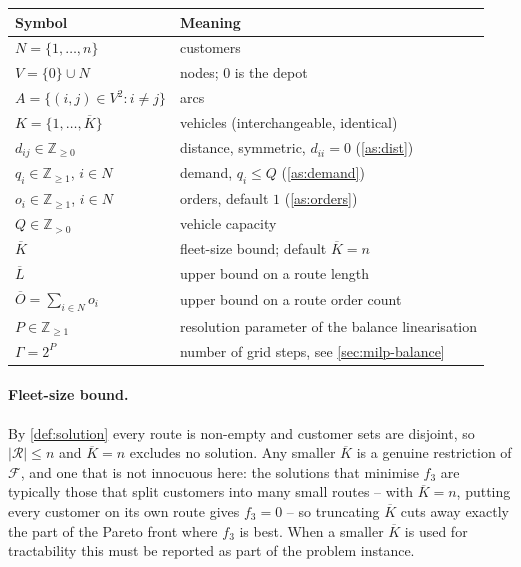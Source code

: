\documentclass[11pt,a4paper]{article}
\theoremstyle{definition}
\theoremstyle{plain}
\newcommand{\Z}{\mathbb{Z}}
\newcommand{\Feas}{\mathcal{F}}
\newcommand{\Routes}{\mathcal{R}}
\newcommand{\Arcs}{A}
\newcommand{\Cust}{N}
\newcommand{\Nodes}{V}
\newcommand{\Veh}{K}
\newcommand{\Lub}{\overline{L}}
\newcommand{\Oub}{\overline{O}}
\begin{document}
\begin{center}
\begin{tabular}{@{}ll@{}}
\toprule
Symbol & Meaning \\
\midrule
$\Cust = \{1,\dots,n\}$ & customers \\
$\Nodes = \{0\} \cup \Cust$ & nodes; $0$ is the depot \\
$\Arcs = \{(i,j) \in \Nodes^2 : i \ne j\}$ & arcs \\
$\Veh = \{1,\dots,\overline{K}\}$ & vehicles (interchangeable, identical) \\
$d_{ij} \in \Z_{\ge0}$ & distance, symmetric, $d_{ii}=0$ (\cref{as:dist}) \\
$q_i \in \Z_{\ge1}$, $i \in \Cust$ & demand, $q_i \le Q$ (\cref{as:demand}) \\
$o_i \in \Z_{\ge1}$, $i \in \Cust$ & orders, default $1$ (\cref{as:orders}) \\
$Q \in \Z_{>0}$ & vehicle capacity \\
$\overline{K}$ & fleet-size bound; default $\overline{K} = n$ \\
$\Lub$ & upper bound on a route length \\
$\Oub = \sum_{i\in\Cust} o_i$ & upper bound on a route order count \\
$P \in \Z_{\ge 1}$ & resolution parameter of the balance linearisation \\
$\Gamma = 2^{P}$ & number of grid steps, see \cref{sec:milp-balance} \\
\bottomrule
\end{tabular}
\end{center}

\paragraph{Fleet-size bound.}
By \cref{def:solution} every route is non-empty and customer sets are disjoint,
so $|\Routes| \le n$ and $\overline{K} = n$ excludes no solution.  Any smaller
$\overline{K}$ is a genuine restriction of $\Feas$, and one that is not
innocuous here: the solutions that minimise $f_3$ are typically those that
split customers into many small routes -- with $\overline{K} = n$, putting every
customer on its own route gives $f_3 = 0$ -- so truncating $\overline{K}$ cuts
away exactly the part of the Pareto front where $f_3$ is best.  When a smaller
$\overline{K}$ is used for tractability this must be reported as part of the
problem instance.
\end{document}
